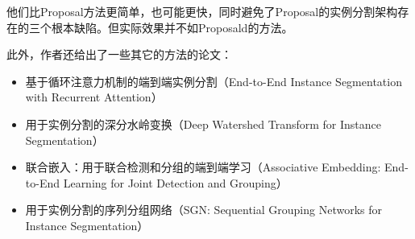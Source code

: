 他们比Proposal方法更简单，也可能更快，同时避免了Proposal的实例分割架构存在的三个根本缺陷。但实际效果并不如Proposald的方法。

此外，作者还给出了一些其它的方法的论文：
\begin{itemize}
\item 基于循环注意力机制的端到端实例分割（End-to-End Instance Segmentation with Recurrent Attention）
\item 用于实例分割的深分水岭变换（Deep Watershed Transform for Instance Segmentation）
\item 联合嵌入：用于联合检测和分组的端到端学习（Associative Embedding: End-to-End Learning for Joint Detection and Grouping）
\item 用于实例分割的序列分组网络（SGN: Sequential Grouping Networks for Instance Segmentation）
\end{itemize}



















